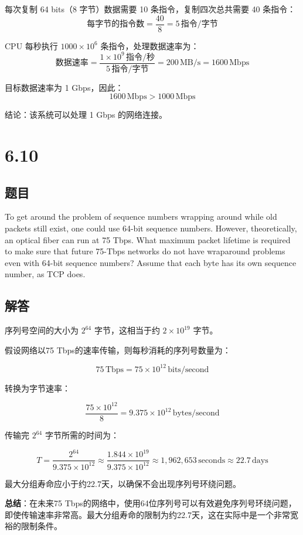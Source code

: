 \documentclass[14pt,a4paper,UTF8,twoside]{article}
\begin{document}
\begin{ans}{}{}
每次复制 64 bits（8 字节）数据需要 10 条指令，复制四次总共需要 40 条指令：
\[
\text{每字节的指令数} = \frac{40}{8} = 5 \, \text{指令/字节}
\]

CPU 每秒执行 \( 1000 \times 10^6 \) 条指令，处理数据速率为：
\[
\text{数据速率} = \frac{1 \times 10^9 \, \text{指令/秒}}{5 \, \text{指令/字节}} = 200 \, \text{MB/s} = 1600 \, \text{Mbps}
\]

目标数据速率为 1 Gbps，因此：
\[
1600 \, \text{Mbps} > 1000 \, \text{Mbps}
\]

结论：该系统可以处理 1 Gbps 的网络连接。
\end{ans}

\section{6.10}

\subsection*{题目}

To get around the problem of sequence numbers wrapping around while old packets still exist, one could use 64-bit sequence numbers. However, theoretically, an optical fiber can run at 75 Tbps. What maximum packet lifetime is required to make sure that future 75-Tbps networks do not have wraparound problems even with 64-bit sequence numbers? Assume that each byte has its own sequence number, as TCP does.

\subsection*{解答}

\begin{ans}{6.10}{6.10}

序列号空间的大小为 \( 2^{64} \) 字节，这相当于约 \( 2 \times 10^{19} \) 字节。

假设网络以75 Tbps的速率传输，则每秒消耗的序列号数量为：

\[
75 \, \text{Tbps} = 75 \times 10^{12} \, \text{bits/second}
\]

转换为字节速率：

\[
\frac{75 \times 10^{12}}{8} = 9.375 \times 10^{12} \, \text{bytes/second}
\]

传输完 \( 2^{64} \) 字节所需的时间为：

\[
T = \frac{2^{64}}{9.375 \times 10^{12}} \approx \frac{1.844 \times 10^{19}}{9.375 \times 10^{12}} \approx 1,962,653 \, \text{seconds} \approx 22.7 \, \text{days}
\]

最大分组寿命应小于约22.7天，以确保不会出现序列号环绕问题。

\textbf{总结}：在未来75 Tbps的网络中，使用64位序列号可以有效避免序列号环绕问题，即使传输速率非常高。最大分组寿命的限制为约22.7天，这在实际中是一个非常宽裕的限制条件。

\end{ans}
\end{document}
